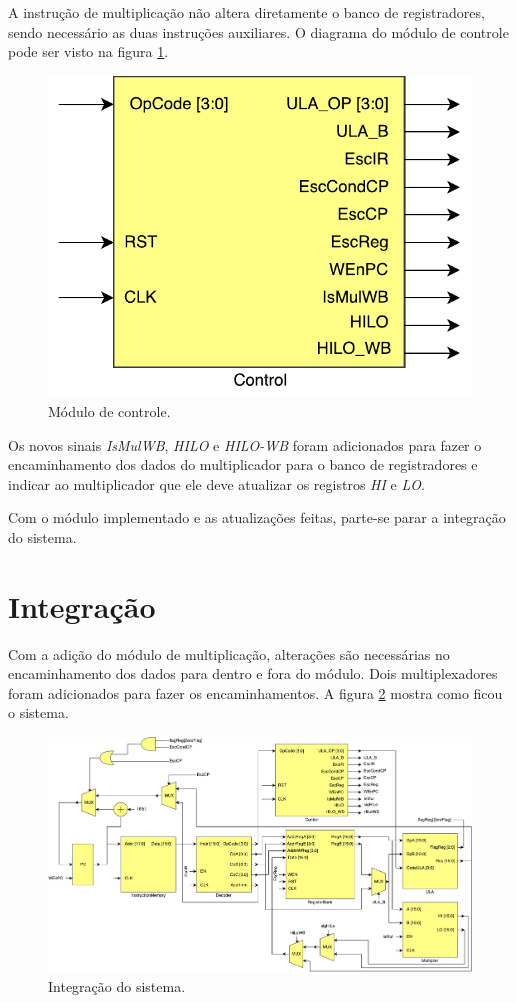\documentclass[11pt,a4paper,titlepage]{article}
\begin{document}
A instrução de multiplicação não altera diretamente o banco de registradores, sendo necessário as duas instruções auxiliares. O diagrama do módulo de controle pode ser visto na figura \ref{fig:ctrl}.

\begin{figure}[!h]
\centering
\includegraphics[scale=0.5]{images/Control.pdf}
\caption{Módulo de controle.}
\label{fig:ctrl}
\end{figure}

Os novos sinais \textit{IsMulWB}, \textit{HILO} e \textit{HILO-WB} foram adicionados para fazer o encaminhamento dos dados do multiplicador para o banco de registradores e indicar ao multiplicador que ele deve atualizar os registros \textit{HI} e \textit{LO}.

Com o módulo implementado e as atualizações feitas, parte-se parar a integração do sistema.

\section{Integração}

Com a adição do módulo de multiplicação, alterações são necessárias no encaminhamento dos dados para dentro e fora do módulo. Dois multiplexadores foram adicionados para fazer os encaminhamentos. A figura \ref{fig:impl} mostra como ficou o sistema.

\begin{figure}[!h]
\centering
\includegraphics[scale=0.4]{images/Microprocessor.pdf}
\caption{Integração do sistema.}
\label{fig:impl}
\end{figure}
\end{document}
